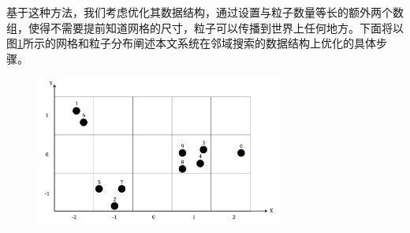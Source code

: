 基于这种方法，我们考虑优化其数据结构，通过设置与粒子数量等长的额外两个数组，使得不需要提前知道网格的尺寸，粒子可以传播到世界上任何地方。下面将以图\ref{fig:gridParticle}所示的网格和粒子分布阐述本文系统在邻域搜索的数据结构上优化的具体步骤。

\begin{figure}[ht]
    \centering
    \includegraphics[height=5cm]{image/gridParticle.png}
    \label{fig:gridParticle}
   \end{figure}


